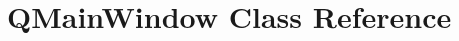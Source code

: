 \hypertarget{classGUI_1_1QMainWindow}{}\section{Q\+Main\+Window Class Reference}
\label{classGUI_1_1QMainWindow}
